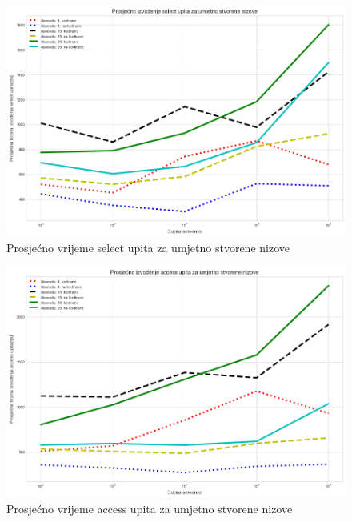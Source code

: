 \begin{figure}[H]
	\centering
	\includegraphics[width=1.0\textwidth] {graphs/graph3.png}
	\caption{Prosjećno vrijeme select upita za umjetno stvorene nizove}
	\label{fig:tree_select_synt}
\end{figure} 

\begin{figure}[H]
	\centering
	\includegraphics[width=1.0\textwidth] {graphs/graph4.png}
	\caption{Prosjećno vrijeme access upita za umjetno stvorene nizove}
	\label{fig:tree_access_synt}
\end{figure} 

